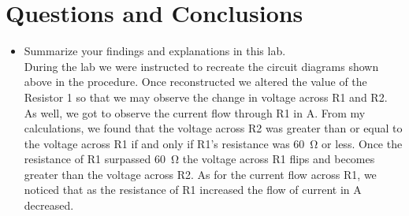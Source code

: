 \documentclass[a4paper]{article}
\begin{document}
\section*{Questions and Conclusions}
\begin{itemize}
	\item Summarize your findings and explanations in this lab. \\
	      During the lab we were instructed to recreate the circuit diagrams shown above in the procedure. Once reconstructed we altered the value of the Resistor 1 so that we may observe the change in voltage across R1 and R2. As well, we got to observe the current flow through R1 in \si{\ampere}. From my calculations, we found that the voltage across R2 was greater than or equal to the voltage across R1 if and only if R1's resistance was \SI{60}{\ohm} or less. Once the resistance of R1 surpassed \SI{60}{\ohm} the voltage across R1 flips and becomes greater than the voltage across R2. As for the current flow across R1, we noticed that as the resistance of R1 increased the flow of current in \si{\ampere} decreased.
\end{itemize}

  
\end{document}
